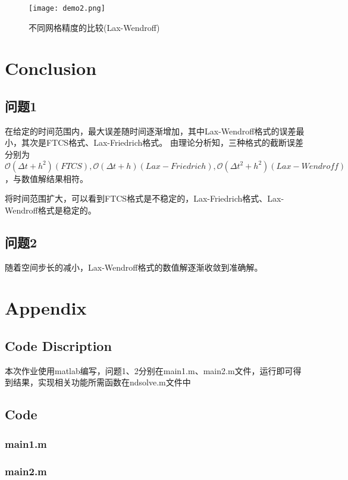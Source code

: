 \documentclass{article}
\begin{document}
\begin{figure}[H]
    \centering
    \texttt{[image: demo2.png]}
    \caption{不同网格精度的比较(Lax-Wendroff)}\label{fig:demo2}
\end{figure}

\section{Conclusion}

\subsection{问题1}
在给定的时间范围内，最大误差随时间逐渐增加，其中Lax-Wendroff格式的误差最小，其次是FTCS格式、Lax-Friedrich格式。
由理论分析知，三种格式的截断误差分别为$\mathcal{O} (\Delta t+h^2)(FTCS), \mathcal{O} (\Delta t+h)(Lax-Friedrich), \mathcal{O} (\Delta t^2+h^2)(Lax-Wendroff)$，与数值解结果相符。

将时间范围扩大，可以看到FTCS格式是不稳定的，Lax-Friedrich格式、Lax-Wendroff格式是稳定的。
\subsection{问题2}
随着空间步长的减小，Lax-Wendroff格式的数值解逐渐收敛到准确解。
\section{Appendix}
\subsection{Code Discription}
本次作业使用matlab编写，问题1、2分别在main1.m、main2.m文件，运行即可得到结果，实现相关功能所需函数在ndsolve.m文件中
\subsection{Code}
\subsubsection{main1.m}

\subsubsection{main2.m}


\end{document}
